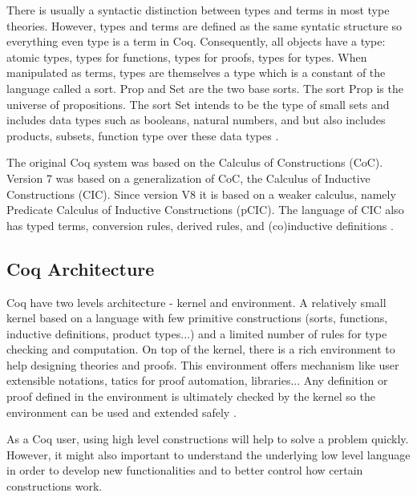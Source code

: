 There is usually a syntactic distinction between types and terms in
most type theories. However, types and terms are defined as the same
syntatic structure so everything even type is a term in
Coq. Consequently, all objects have a type:  atomic types, types for
functions, types for proofs, types for types. When manipulated as
terms, types are themselves a type which is a constant of the language
called a sort. Prop and Set are the two base sorts. The sort Prop is
the universe of propositions. The sort Set intends to be the type of
small sets and includes data types such as booleans, natural numbers,
and but also includes products, subsets, function type over these data
types \cite{CoqReferenceManual}.

The original Coq system was based on the Calculus of Constructions
(CoC). %
Version 7 was based on a generalization of CoC, the Calculus of Inductive
Constructions (CIC). %
Since version V8 it is based on a weaker calculus, namely Predicate
Calculus of Inductive Constructions (pCIC). %
The language of CIC also has typed terms, conversion rules,
derived rules, and (co)inductive definitions \cite{CoqReferenceManual}.

\subsection{Coq Architecture}
Coq have two levels architecture - kernel and environment. A relatively small kernel based on a language with few primitive constructions (sorts, functions, inductive definitions, product types...) and a limited number of rules for type checking and computation. On top of the kernel, there is a rich environment to help designing theories and proofs. This environment offers mechanism like user extensible notations, tatics for proof automation, libraries... Any definition or proof defined in the environment is ultimately checked by the kernel so the environment can be used and extended safely \cite{paulin2012introduction}.

As a Coq user, using high level constructions will help to solve a problem quickly. However, it might also important to understand the underlying low level language in order to develop new functionalities and to better control how certain constructions work. 
 







